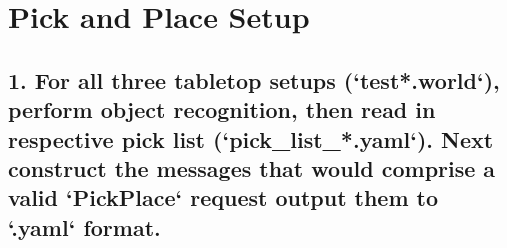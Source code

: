 \documentclass{article}
\begin{document}
\section{Pick and Place Setup}

\subsection{1. For all three tabletop setups (`test*.world`), perform object recognition, then read in respective pick list (`pick\_list\_*.yaml`). Next construct the messages that would comprise a valid `PickPlace` request output them to `.yaml` format.}


\end{document}
